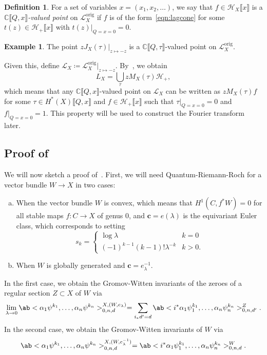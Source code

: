 \documentclass[leqno, openany]{memoir}
\theoremstyle{definition}
\newtheorem{defn}[thm]{Definition}
\newtheorem{exm}[thm]{Example}
\theoremstyle{remark}
\theoremstyle{plain}
\theoremstyle{definition}
\theoremstyle{remark}
\newcommand{\C}{\mathbb{C}}
\newcommand{\mc}[1]{\mathcal{#1}}
\newcommand{\mr}[1]{\mathrm{#1}}
\newcommand{\mbf}[1]{\mathbf{#1}}
\begin{document}
\begin{defn}
    For a set of variables $x = (x_1, x_2, \ldots)$, we say that $f \in \mc{H}_X \llbracket x \rrbracket$ is a \textit{$\C\llbracket Q,x \rrbracket$-valued point} on $\mc{L}_X^{\mr{orig}}$ if $f$ is of the form~\ref{eqn:lagcone} for some $t(z) \in \mc{H}_+ \llbracket x \rrbracket$ with $t(z)|_{Q=x=0} = 0$.
\end{defn}

\begin{exm}
    The point $z J_X(\tau)|_{z \mapsto -z}$ is a $\C\llbracket Q,\tau \rrbracket$-valued point on $\mc{L}_X^{\mr{orig}}$.
\end{exm}

Given this, define $\mc{L}_X \coloneqq \mc{L}_X^{\mr{orig}}|_{z \mapsto -z}$. By~, we obtain
\[ L_X = \bigcup_{\tau} z M_X(\tau) \mc{H}_+, \]
which means that any $\C\llbracket Q,x \rrbracket$-valued point on $\mc{L}_X$ can be written as $z M_X(\tau) f$ for some $\tau \in H^*(X) \llbracket Q,x \rrbracket$ and $f \in \mc{H}_+ \llbracket x \rrbracket$ such that $\tau |_{Q=x=0} = 0$ and $f |_{Q=x=0} = 1$. This property will be used to construct the Fourier transform later.

\subsection{Proof of~}%
\label{sub:Proof of the mirror theorem}

We will now sketch a proof of~. First, we will need Quantum-Riemann-Roch for a vector bundle $W \to X$ in two cases:
\begin{enumerate}[(a)]
    \item When the vector bundle $W$ is convex, which means that $H^1(C, f^*W) = 0$ for all stable maps $f \colon C \to X$ of genus $0$, and $\mbf{c} = e(\lambda)$ is the equivariant Euler class, which corresponds to setting
        \[ s_k = \begin{cases}
            \log \lambda & k=0 \\
            (-1)^{k-1} (k-1)! \lambda^{-k} & k > 0 .
        \end{cases}
        \]
    \item When $W$ is globally generated and $\mbf{c} = e_{\lambda}^{-1}$.
\end{enumerate}

In the first case, we obtain the Gromov-Witten invariants of the zeroes of a regular section $Z \subset X$ of $W$ via
\[ \lim_{\lambda \to 0} \ab< \alpha_1 \psi^{k_1},\ldots,\alpha_n \psi^{k_n}>_{0,n,d}^{X,(W,e_{\lambda})} = \sum_{i_* d' = d} \ab<i^* \alpha_1 \psi_1^{k_1},\ldots,\alpha_n \psi_n^{k_n}>_{0,n,d'}^Z. \]
In the second case, we obtain the Gromov-Witten invariants of $W$ via
\[ \ab< \alpha_1 \psi^{k_1},\ldots,\alpha_n \psi^{k_n}>_{0,n,d}^{X,(W,e_{\lambda}^{-1})} = \ab<i^* \alpha_1 \psi_1^{k_1},\ldots,\alpha_n \psi_n^{k_n}>_{0,n,d}^W. \]
\end{document}
